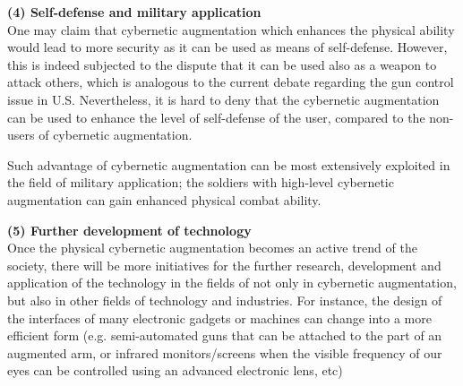 
{\bf (4) Self-defense and military application}\\
One may claim that cybernetic augmentation which enhances the physical ability would lead to more security as it can be used as means of self-defense. However, this is indeed subjected to the dispute that it can be used also as a weapon to attack others, which is analogous to the current debate regarding the gun control issue in U.S. Nevertheless, it is hard to deny that the cybernetic augmentation can be used to enhance the level of self-defense of the user, compared to the non-users of cybernetic augmentation.

Such advantage of cybernetic augmentation can be most extensively exploited in the field of military application; the soldiers with high-level cybernetic augmentation can gain enhanced physical combat ability.

{\bf (5) Further development of technology}\\
Once the physical cybernetic augmentation becomes an active trend of the society, there will be more initiatives for the further research, development and application of the technology in the fields of not only in cybernetic augmentation, but also in other fields of technology and industries. For instance, the design of the interfaces of many electronic gadgets or machines can change into a more efficient form (e.g. semi-automated guns that can be attached to the part of an augmented arm, or infrared monitors/screens when the visible frequency of our eyes can be controlled using an advanced electronic lens, etc)


